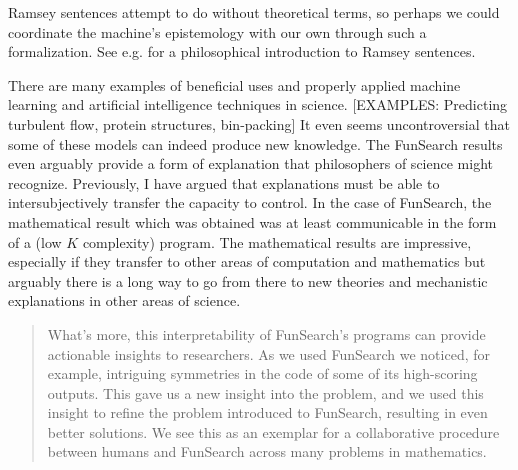 \documentclass[11pt, oneside]{article}   	%
\begin{document}
Ramsey sentences attempt to do without theoretical terms, so perhaps we could coordinate the machine's epistemology with our own through such a formalization.  See e.g. \citep[\S 26]{Carnap1966} for a philosophical introduction to Ramsey sentences.







There are many examples of beneficial uses and properly applied machine learning and artificial intelligence techniques in science.  [EXAMPLES: Predicting turbulent flow, protein structures, bin-packing]  It even seems uncontroversial that some of these models can indeed produce new knowledge.  \citep{FunSearch2024}  The FunSearch results even arguably provide a form of explanation that philosophers of science might recognize.  Previously, I have argued that explanations must be able to intersubjectively transfer the capacity to control.  In the case of FunSearch, the mathematical result which was obtained was at least communicable in the form of a (low $K$ complexity) program. The mathematical results are impressive, especially if they transfer to other areas of computation and mathematics but arguably there is a long way to go from there to new theories and mechanistic explanations in other areas of science.  


\begin{quote}
    What’s more, this interpretability of FunSearch’s programs can provide actionable insights to researchers. As we used FunSearch we noticed, for example, intriguing symmetries in the code of some of its high-scoring outputs. This gave us a new insight into the problem, and we used this insight to refine the problem introduced to FunSearch, resulting in even better solutions. We see this as an exemplar for a collaborative procedure between humans and FunSearch across many problems in mathematics.

    \citep{FunSearch2024}
\end{quote}
\end{document}
